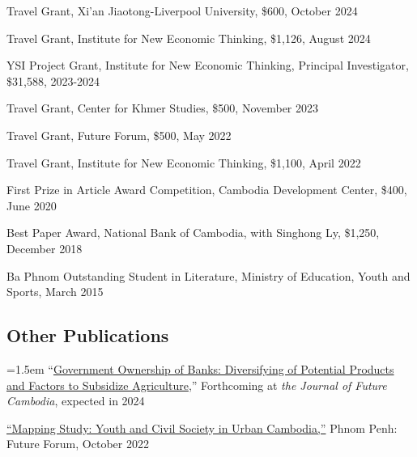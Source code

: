 \documentclass[10pt,a4paper]{article}
\begin{document}
	Travel Grant, Xi'an Jiaotong-Liverpool University, \$600, October 2024
	
	Travel Grant, Institute for New Economic Thinking, \$1,126, August 2024
	
	YSI Project Grant, Institute for New Economic Thinking, Principal Investigator, \$31,588, 2023-2024
	
	Travel Grant, Center for Khmer Studies, \$500, November 2023
	
	Travel Grant, Future Forum, \$500, May 2022
	
	Travel Grant, Institute for New Economic Thinking, \$1,100, April 2022
	
	First Prize in Article Award Competition, Cambodia Development Center, \$400, June 2020
	
	Best Paper Award, National Bank of Cambodia, with Singhong Ly, \$1,250, December 2018 
	
	Ba Phnom Outstanding Student in Literature, Ministry of Education, Youth and Sports, March 2015
	




\subsection*{Other Publications}

	\hangindent=1.5em
	“\href{https://kosalnith.github.io/research/papers/GOB.pdf}{Government Ownership of Banks: Diversifying of Potential Products and Factors to Subsidize Agriculture},” Forthcoming at \textit{the Journal of Future Cambodia}, expected in 2024 \\ \vspace{-.5em} 
	
	\href{}{``Mapping Study: Youth and Civil Society in Urban Cambodia,”} Phnom Penh: Future Forum, October 2022\\ \vspace{-.5em} 
	
\end{document}
